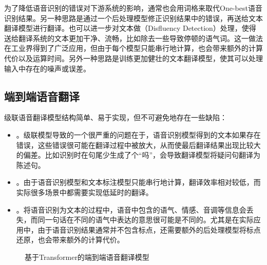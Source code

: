 \parinterval 为了降低语音识别的错误对下游系统的影响，通常也会用词格来取代One-best语音识别结果。另一种思路是通过一个后处理模型修正识别结果中的错误，再送给文本翻译模型进行翻译。也可以进一步对文本做{\small{}}（Disfluency Detection）处理，使得送给翻译系统的文本更加干净、流畅，比如除去一些导致停顿的语气词。这一做法在工业界得到了广泛应用，但由于每个模型只能串行地计算，也会带来额外的计算代价以及运算时间。另外一种思路是训练更加健壮的文本翻译模型，使其可以处理输入中存在的噪声或误差。


\subsection{端到端语音翻译}

\parinterval 级联语音翻译模型结构简单、易于实现，但不可避免地存在一些缺陷：

\begin{itemize}
    \item {\small{}}。级联模型导致的一个很严重的问题在于，语音识别模型得到的文本如果存在错误，这些错误很可能在翻译过程中被放大，从而使最后翻译结果出现比较大的偏差。比如识别时在句尾少生成了个“吗”，会导致翻译模型将疑问句翻译为陈述句。
    \vspace{0.5em}
    \item {\small{}}。由于语音识别模型和文本标注模型只能串行地计算，翻译效率相对较低，而实际很多场景中都需要实现低延时的翻译。
    \vspace{0.5em}
    \item {\small{}}。将语音识别为文本的过程中，语音中包含的语气、情感、音调等信息会丢失，而同一句话在不同的语气中表达的意思很可能是不同的。尤其是在实际应用中，由于语音识别结果通常并不包含标点，还需要额外的后处理模型将标点还原，也会带来额外的计算代价。
\end{itemize}

\begin{figure}[htp]
\centering

\setlength{\abovecaptionskip}{-0.2em}
\caption{基于Transformer的端到端语音翻译模型}
\label{fig:17-7}
\end{figure}

